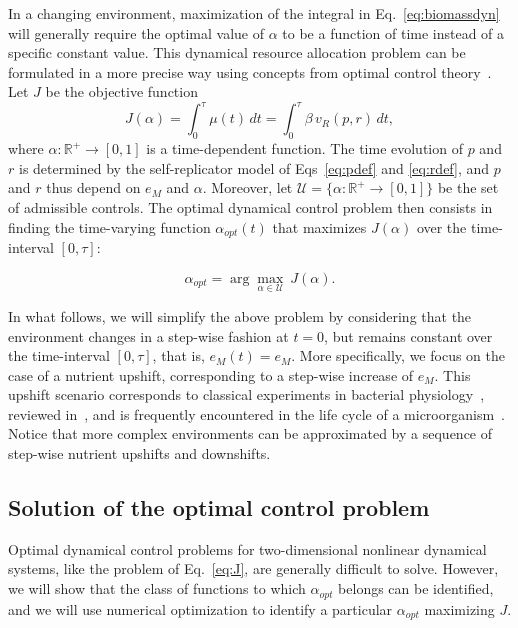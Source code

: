 In a changing environment, maximization of the integral in Eq.~\ref{eq:biomassdyn} will generally require the optimal value of $\alpha$ to be a function of time instead of a specific constant value.
This dynamical resource allocation problem can be formulated in a more precise way using concepts from optimal control theory~\cite{stengel_optimal_1994}. 
Let $J$ be the objective function  
\begin{equation*}
J(\alpha)= \int_{0}^{\tau} \mu(t) \, dt = \int_{0}^{\tau} \beta \, v_R(p,r) \, dt,
\end{equation*}
where $\alpha:\mathbb{R}^+ \rightarrow [0,1]$ is a time-dependent function. 
The time evolution of $p$ and $r$ is determined by the self-replicator model of Eqs~\ref{eq:pdef} and \ref{eq:rdef}, and $p$ and $r$ thus depend on $e_M$ and $\alpha$. 
Moreover, let $\mathcal{U}=\{\alpha:\mathbb{R}^+ \rightarrow [0,1] \}$ be the set of admissible controls. 
The optimal dynamical control problem then consists in finding the time-varying function $\alpha_{opt}(t)$ that maximizes $J(\alpha)$ over the time-interval $[0,\tau]$:

\begin{equation}
\alpha_{opt} = \arg \underset{\alpha \in \mathcal{U}}{\max} \ J(\alpha).
\label{eq:J}
\end{equation}

In what follows, we will simplify the above problem by considering that the environment changes in a step-wise fashion at $t=0$, but remains constant over the time-interval $[0,\tau]$, that is, $e_M(t)=e_M$.
More specifically, we focus on the case of a nutrient upshift, corresponding to a step-wise increase of $e_M$.
This upshift scenario corresponds to classical experiments in bacterial physiology~\cite{kjeldgaard_kinetics_1961,schaechter_patterns_1961,johnsen_control_1977}, reviewed in~\cite{ehrenberg_mediumdependent_2012}, and is frequently encountered in the life cycle of a microorganism~\cite{schaechter_microbe_2006}.
Notice that more complex environments can be approximated by a sequence of step-wise nutrient upshifts and downshifts.

\subsection{Solution of the optimal control problem}
\label{sec:optimalcontrolsolution}

Optimal dynamical control problems for two-dimensional nonlinear dynamical systems, like the problem of Eq.~\ref{eq:J}, are generally difficult to solve.
However, we will show that the class of functions to which $\alpha_{opt}$ belongs can be identified, and we will use numerical optimization to identify a particular $\alpha_{opt}$ maximizing $J$.

